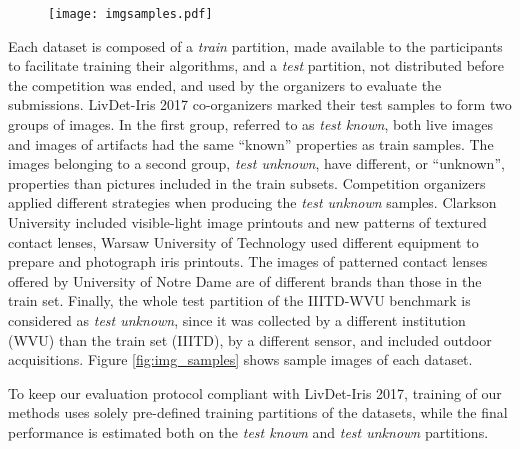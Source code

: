\begin{figure*}[!htb]
    \centering
    \begin{subfigure}[b]{0.99\linewidth}
        \texttt{[image: imgsamples.pdf]}
    \end{subfigure}
    \caption{Image samples from all datasets, from the \emph{train} and \emph{unknown} partitions. The difference between train and unknown images, especially in the case of attacks, illustrates situations where classifiers commonly fail.}
    \label{fig:img_samples}
\end{figure*}

Each dataset is composed of a \emph{train} partition, made available to the participants to facilitate training their algorithms, and a \emph{test} partition, not distributed before the competition was ended, and used by the organizers to evaluate the submissions. LivDet-Iris 2017 co-organizers marked their test samples to form two groups of images. In the first group, referred to as \emph{test known}, both live images and images of artifacts had the same ``known'' properties as train samples. The images belonging to a second group, \emph{test unknown}, have different, or ``unknown'', properties than pictures included in the train subsets. Competition organizers applied different strategies when producing the \emph{test unknown} samples. Clarkson University included visible-light image printouts and new patterns of textured contact lenses, Warsaw University of Technology used different equipment to prepare and photograph iris printouts. The images of patterned contact lenses offered by University of Notre Dame are of different brands than those in the train set. Finally, the whole test partition of the IIITD-WVU benchmark is considered as \emph{test unknown}, since it was collected by a different institution (WVU) than the train set (IIITD), by a different sensor, and included outdoor acquisitions. Figure \ref{fig:img_samples} shows sample images of each dataset.

To keep our evaluation protocol compliant with LivDet-Iris 2017, training of our methods uses solely pre-defined training partitions of the datasets, while the final performance is estimated both on the \emph{test known} and \emph{test unknown} partitions.

